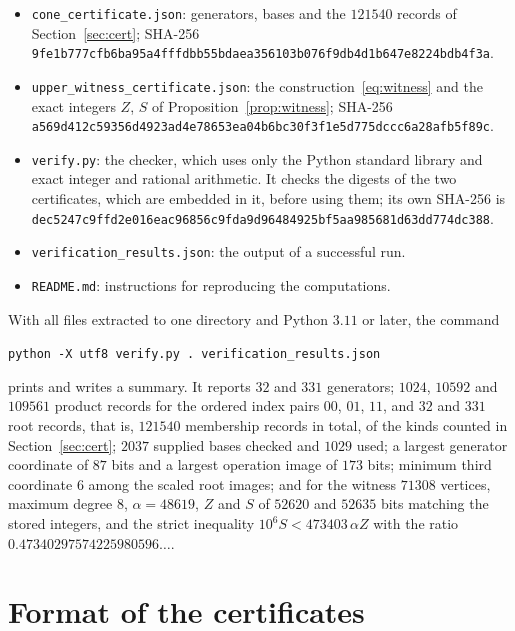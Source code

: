 \documentclass{amsart}
\numberwithin{equation}{section}
\theoremstyle{plain}
\theoremstyle{definition}
\theoremstyle{remark}
\newcommand{\hash}[1]{\texttt{\footnotesize #1}}
\begin{document}
\begin{itemize}[leftmargin=*]
\item \texttt{cone\_certificate.json}: generators, bases and the $121540$ records of Section~\ref{sec:cert}; SHA-256\\ \hash{9fe1b777cfb6ba95a4fffdbb55bdaea356103b076f9db4d1b647e8224bdb4f3a}.
\item \texttt{upper\_witness\_certificate.json}: the construction~\eqref{eq:witness} and the exact integers $Z$, $S$ of Proposition~\ref{prop:witness}; SHA-256\\ \hash{a569d412c59356d4923ad4e78653ea04b6bc30f3f1e5d775dccc6a28afb5f89c}.
\item \texttt{verify.py}: the checker, which uses only the Python standard library and exact integer and rational arithmetic. It checks the digests of the two certificates, which are embedded in it, before using them; its own SHA-256 is\\ \hash{dec5247c9ffd2e016eac96856c9fda9d96484925bf5aa985681d63dd774dc388}.
\item \texttt{verification\_results.json}: the output of a successful run.
\item \texttt{README.md}: instructions for reproducing the computations.
\end{itemize}

With all files extracted to one directory and Python $3.11$ or later, the command
\begin{center}\texttt{python -X utf8 verify.py . verification\_results.json}\end{center}
prints and writes a summary. It reports $32$ and $331$ generators; $1024$, $10592$ and $109561$ product records for the ordered index pairs $00$, $01$, $11$, and $32$ and $331$ root records, that is, $121540$ membership records in total, of the kinds counted in Section~\ref{sec:cert}; $2037$ supplied bases checked and $1029$ used; a largest generator coordinate of $87$ bits and a largest operation image of $173$ bits; minimum third coordinate $6$ among the scaled root images; and for the witness $71308$ vertices, maximum degree $8$, $\alpha=48619$, $Z$ and $S$ of $52620$ and $52635$ bits matching the stored integers, and the strict inequality $10^6S<473403\,\alpha Z$ with the ratio $0.47340297574225980596\ldots$.

\section{Format of the certificates}\label{app:format}
\end{document}
